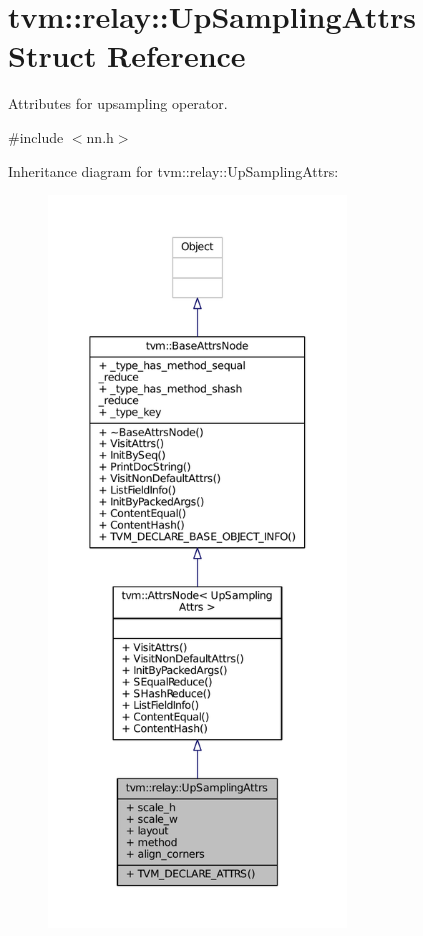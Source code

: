 \hypertarget{structtvm_1_1relay_1_1UpSamplingAttrs}{}\section{tvm\+:\+:relay\+:\+:Up\+Sampling\+Attrs Struct Reference}
\label{structtvm_1_1relay_1_1UpSamplingAttrs}


Attributes for upsampling operator.  




{\ttfamily \#include $<$nn.\+h$>$}



Inheritance diagram for tvm\+:\+:relay\+:\+:Up\+Sampling\+Attrs\+:
\nopagebreak
\begin{figure}[H]
\begin{center}
\leavevmode
\includegraphics[height=550pt]{structtvm_1_1relay_1_1UpSamplingAttrs__inherit__graph}
\end{center}
\end{figure}


